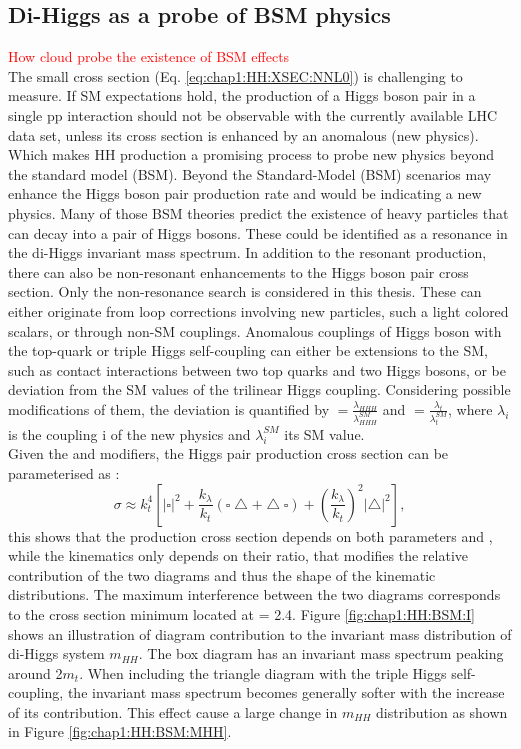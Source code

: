 \subsection{Di-Higgs as a probe of BSM physics}
\label{chap1:HH:BSM}
\textcolor{red}{How \kl cloud probe the existence of BSM effects} \\
The small cross section (Eq. \ref{eq:chap1:HH:XSEC:NNL0}) is challenging to measure. If SM expectations hold, the production of a Higgs boson pair in a single pp interaction should not be observable with the currently available LHC data set, unless its cross section is enhanced by an anomalous (new physics). Which makes HH production a promising process to probe new physics beyond the standard model (BSM). Beyond the Standard-Model (BSM) scenarios may enhance the Higgs boson pair production rate and would be indicating a new physics. Many of those BSM theories predict the existence of heavy particles that can decay into a pair of Higgs bosons. These could be identified as a resonance in the di-Higgs invariant mass spectrum. In addition to the resonant production, there can also be non-resonant enhancements to the Higgs boson pair cross section. Only the non-resonance search is considered in this thesis. These can either originate from loop corrections involving new particles, such a light colored scalars, or through non-SM couplings. Anomalous couplings of Higgs boson with the top-quark or triple Higgs self-coupling can either be extensions to the SM, such as contact interactions between two top quarks and two Higgs bosons, or be deviation from the SM values of the trilinear Higgs coupling. Considering possible modifications of them, the deviation is quantified by \kl $ = \frac{\lambda_{HHH}}{\lambda_{HHH}^{SM}}$ and \kt $= \frac{\lambda_{t}}{\lambda_{t}^{SM}}$, where $\lambda_{i}$ is the coupling i of the new physics and $\lambda_{i}^{SM}$ its SM value. \\
Given the \kt and \kl modifiers, the Higgs pair production cross section can be parameterised as :
\begin{equation}
  \sigma \approx k_{t}^{4}\left[|\square|^{2}+\frac{k_{\lambda}}{k_{t}}(\square\bigtriangleup+\bigtriangleup \square)+\left(\frac{k_{\lambda}}{k_{t}}\right)^{2}|\bigtriangleup|^{2}\right], 
\end{equation}
this shows that the production cross section depends on both parameters \kt and \kl, while the kinematics only depends on their ratio, that modifies the relative contribution of the two diagrams and thus the shape of the kinematic distributions. The maximum interference between the two diagrams corresponds to the cross section minimum located at \kl = 2.4\kt. Figure \ref{fig:chap1:HH:BSM:I} shows an illustration of diagram contribution to the invariant mass distribution of di-Higgs system $m_{HH}$. The box diagram has an invariant mass spectrum peaking around 2$m_t$. When including the triangle diagram with the triple Higgs self-coupling, the invariant mass spectrum becomes generally softer with the increase of its contribution. This effect cause a large change in $m_{HH}$ distribution as shown in Figure \ref{fig:chap1:HH:BSM:MHH}.
